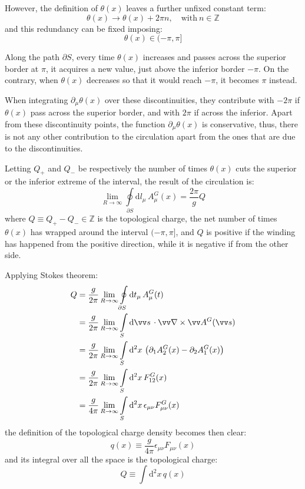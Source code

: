 However, the definition of $\theta(x)$ leaves a further unfixed constant term:
\[
    \theta(x) \rightarrow \theta(x) + 2\pi n, \quad \text{with}\ n \in \mathbb Z
\]
and this redundancy can be fixed imposing:
\[
    \theta(x) \in (-\pi,\pi]
\]

Along the path $\partial S$, every time $\theta(x)$ increases and passes across the superior border at $\pi$, it acquires a new value,
just above the inferior border $-\pi$.
On the contrary, when $\theta(x)$ decreases so that it would reach $-\pi$, it becomes $\pi$ instead.

When integrating $\partial_\mu\theta(x)$ over these discontinuities,
they contribute with $-2\pi$ if $\theta(x)$ pass across the superior border, and with $2\pi$ if across the inferior.
Apart from these discontinuity points, the function $\partial_\mu\theta(x)$ is conservative, thus,
there is not any other contribution to the circulation apart from the ones that are due to the discontinuities.

Letting $Q_+$ and $Q_-$ be respectively the number of times $\theta(x)$ cuts the superior or the inferior extreme of the interval,
the result of the circulation is:
\[
    \lim_{R\to\infty}\oint\limits_{\partial S}\mathrm dl_\mu\,A^G_\mu(x) = \frac{2\pi}{g} Q
\]
where $Q \equiv Q_+ - Q_- \in \mathbb Z$ is the topological charge, \ie the net number of times $\theta(x)$ has wrapped around the interval $(-\pi,\pi]$,
and $Q$ is positive if the winding has happened from the positive direction, while it is negative if from the other side.

Applying Stokes theorem:
\begin{align*}
    Q &= \frac{g}{2\pi}\lim_{R\to\infty}\oint\limits_{\partial S}\mathrm dt_\mu\,A^G_\mu(t) \\
      &= \frac{g}{2\pi}\lim_{R\to\infty}\int\limits_S\mathrm d\vv s\,\cdot \vv\nabla \times \vv A^G(\vv s) \\
      &= \frac{g}{2\pi}\lim_{R\to\infty}\int\limits_S\mathrm d^2x\, \left(\partial_1 A^G_2(x) - \partial_2 A^G_1(x)\right) \\
      &= \frac{g}{2\pi}\lim_{R\to\infty}\int\limits_S\mathrm d^2x\, F^G_{12}(x) \\
      &= \frac{g}{4\pi}\lim_{R\to\infty}\int\limits_S\mathrm d^2x\, \epsilon_{\mu\nu}F^G_{\mu\nu}(x)
\end{align*}
the definition of the topological charge density becomes then clear:
\begin{equation}\label{eq:top_charge_density}
    q(x) \equiv \frac{g}{4\pi}\epsilon_{\mu\nu}F_{\mu\nu}(x)
\end{equation}
and its integral over all the space is the topological charge:
\begin{equation}\label{eq:top_charge}
    Q \equiv \int\mathrm d^2x\,q(x)
\end{equation}

